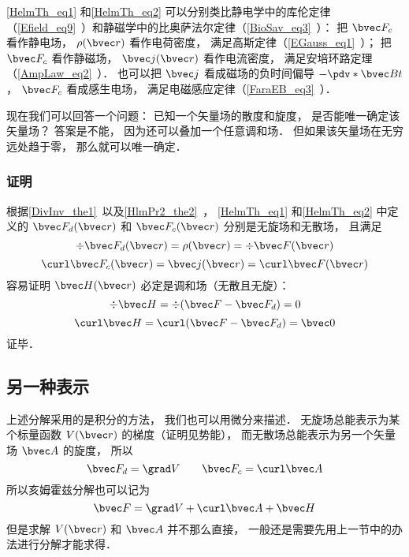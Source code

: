 \autoref{HelmTh_eq1} 和\autoref{HelmTh_eq2} 可以分别类比静电学中的库伦定律（\autoref{Efield_eq9}~）和静磁学中的比奥萨法尔定律（\autoref{BioSav_eq3}~）： 把 $\bvec F_c$ 看作静电场， $\rho(\bvec r)$ 看作电荷密度， 满足高斯定律（\autoref{EGauss_eq1}~）； 把 $\bvec F_c$ 看作静磁场， $\bvec j(\bvec r)$ 看作电流密度， 满足安培环路定理（\autoref{AmpLaw_eq2}~）． 也可以把 $\bvec j$ 看成磁场的负时间偏导 $-\pdv*{\bvec B}{t}$， $\bvec F_c$ 看成感生电场， 满足电磁感应定律（\autoref{FaraEB_eq3}~）．

现在我们可以回答一个问题： 已知一个矢量场的散度和旋度， 是否能唯一确定该矢量场？ 答案是不能， 因为还可以叠加一个任意调和场． 但如果该矢量场在无穷远处趋于零， 那么就可以唯一确定．

\subsubsection{证明}
根据\autoref{DivInv_the1}~以及\autoref{HlmPr2_the2}~， \autoref{HelmTh_eq1} 和\autoref{HelmTh_eq2} 中定义的 $\bvec F_{d}(\bvec r)$ 和 $\bvec F_{c}(\bvec r)$ 分别是无旋场和无散场， 且满足
\begin{equation}
\div \bvec F_d(\bvec r) = \rho(\bvec r) = \div \bvec F(\bvec r)
\end{equation}
\begin{equation}
\curl \bvec F_c(\bvec r) = \bvec j(\bvec r) = \curl \bvec F(\bvec r)
\end{equation}
容易证明 $\bvec H(\bvec r)$ 必定是调和场（无散且无旋）：
\begin{equation}
\div \bvec H = \div (\bvec F - \bvec F_d) = 0
\end{equation}
\begin{equation}
\curl \bvec H = \curl (\bvec F - \bvec F_d) = \bvec 0
\end{equation}
证毕．

\subsection{另一种表示}
上述分解采用的是积分的方法， 我们也可以用微分来描述． 无旋场总能表示为某个标量函数 $V(\bvec r)$ 的梯度（证明见势能）， 而无散场总能表示为另一个矢量场 $\bvec A$ 的旋度， 所以
\begin{equation}
\bvec F_{d} = \grad V\qquad \bvec F_{c} = \curl \bvec A
\end{equation}
所以亥姆霍兹分解也可以记为
\begin{equation}
\bvec F = \grad V + \curl \bvec A + \bvec H
\end{equation}
但是求解 $V(\bvec r)$ 和 $\bvec A$ 并不那么直接， 一般还是需要先用上一节中的办法进行分解才能求得．
